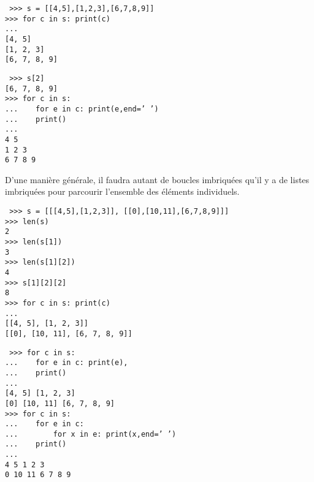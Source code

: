 \noindent\mbox{}\hspace*{1cm}\begin{py}{6.5cm}\tt
>>> s = [[4,5],[1,2,3],[6,7,8,9]]\\
>>> for c in s: print(c) \\
... \\
\mbox{}[4, 5]\\
\mbox{}[1, 2, 3]\\
\mbox{}[6, 7, 8, 9]
\end{py}
\hfill
\begin{py}{6.5cm}\tt
>>> s[2]\\
\mbox{}[6, 7, 8, 9]\\
>>> for c in s:\\
...\ \ \ \ for e in c: print(e,end=' ')\\
...\ \ \ \ print()\\
... \\
4 5\\
1 2 3\\
6 7 8 9
\end{py}
\vspace*{2mm}

\noindent D'une manière générale, il faudra autant de boucles imbriquées qu'il y a de listes
imbriquées pour parcourir l'ensemble des éléments individuels.

\noindent\mbox{}\hspace*{1cm}\begin{py}{9cm}\tt
>>> s = [[[4,5],[1,2,3]], [[0],[10,11],[6,7,8,9]]]\\
>>> len(s)\\
2\\
>>> len(s[1])\\
3\\
>>> len(s[1][2])\\
4\\
>>> s[1][2][2]\\
8\\
>>> for c in s: print(c)\\
... \\
\mbox{}[[4, 5], [1, 2, 3]]\\
\mbox{}[[0], [10, 11], [6, 7, 8, 9]]
\end{py}
\hfill
\begin{py}{6cm}\tt
>>> for c in s:\\
...\ \ \ \ for e in c: print(e),\\
...\ \ \ \ print()\\
... \\
\mbox{}[4, 5] [1, 2, 3]\\
\mbox{}[0] [10, 11] [6, 7, 8, 9]\\
>>> for c in s:\\
...\ \ \ \ for e in c:\\
...\ \ \ \ \ \ \ \ for x in e: print(x,end=' ')\\
...\ \ \ \ print()\\
... \\
4 5 1 2 3\\
0 10 11 6 7 8 9
\end{py}
\vspace*{2mm}

